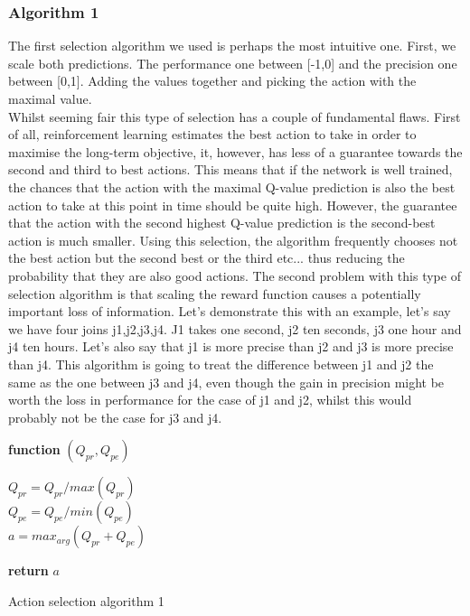 \subsubsection{Algorithm 1}
The first selection algorithm we used is perhaps the most intuitive one. First, we scale both predictions. The performance one between [-1,0] and the precision one between [0,1]. Adding the values together and picking the action with the maximal value.\\
Whilst seeming fair this type of selection has a couple of fundamental flaws. First of all, reinforcement learning estimates the best action to take in order to maximise the long-term objective, it, however, has less of a guarantee towards the second and third to best actions. This means that if the network is well trained, the chances that the action with the maximal Q-value prediction is also the best action to take at this point in time should be quite high. However, the guarantee that the action with the second highest Q-value prediction is the second-best action is much smaller. Using this selection, the algorithm frequently chooses not the best action but the second best or the third etc... thus reducing the probability that they are also good actions. The second problem with this type of selection algorithm is that scaling the reward function causes a potentially important loss of information. Let's demonstrate this with an example, let's say we have four joins j1,j2,j3,j4. J1 takes one second, j2 ten seconds, j3 one hour and j4 ten hours. Let's also say that j1 is more precise than j2 and j3 is more precise than j4. This algorithm is going to treat the difference between j1 and j2 the same as the one between j3 and j4, even though the gain in precision might be worth the loss in performance for the case of j1 and j2, whilst this would probably not be the case for j3 and j4.
\begin{center}
\begin{algorithm}[H]

    \textbf{function}  $(Q_{pr},Q_{pe})$\;
    
    
    \Indp{}\Indm
    \Indp{} \Indm
    \Indp
    $Q_{pr} = Q_{pr}/max(Q_{pr})$\\
    $Q_{pe} = Q_{pe}/min(Q_{pe})$\\
    $a = max_{arg}(Q_{pr}+Q_{pe})$
    
  
   \textbf{return} $a$

\caption{Action selection algorithm 1}
\end{algorithm}
\end{center}
